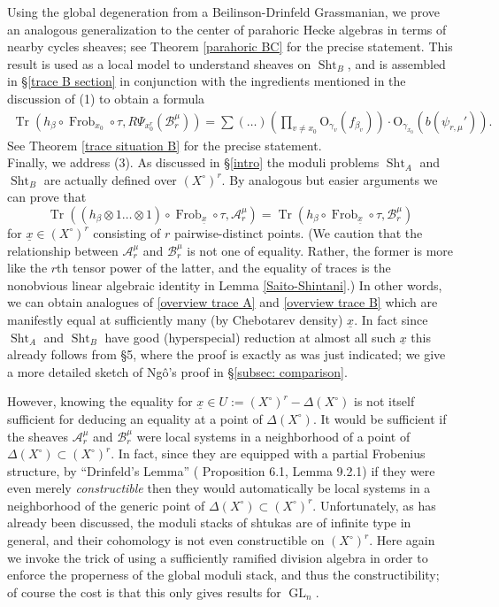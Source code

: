 \documentclass[reqno]{amsart}
\numberwithin{equation}{section}
\newcommand{\ul}[1]{\underline{#1}}
\newcommand{\Cal}[1]{\mathcal{#1}}
\newcommand{\mrm}[1]{\mathrm{#1}}
\DeclareMathOperator{\GL}{GL}
\DeclareMathOperator{\Frob}{Frob}
\DeclareMathOperator{\Tr}{Tr}
\DeclareMathOperator{\Sht}{Sht}
\theoremstyle{remark}
\numberwithin{equation}{section}
\begin{document}
Using the global degeneration from a Beilinson-Drinfeld Grassmanian, we prove an analogous generalization to the center of parahoric Hecke algebras in terms of nearby cycles sheaves; see Theorem \ref{parahoric BC} for the precise statement. This result is used as a local model to understand sheaves on $\Sht_B$, and is assembled in \S \ref{trace B section} in conjunction with the ingredients mentioned in the discussion of (1) to obtain a formula
\begin{align}\label{overview trace B}
\Tr( h_{\beta} \circ \Frob_{x_0} \circ  \tau , R\Psi_{x_0^r}(\Cal{B}_r^{\mu})) =   \sum (\ldots)\left(  \prod_{v \neq x_0} \mrm{O}_{\gamma_v}(f_{\beta_v}) \right) \cdot  \mrm{O}_{\gamma_{x_0}}(b(\psi_{r,\mu}')).
\end{align}
See Theorem \ref{trace situation B} for the precise statement. \\

Finally, we address (3). As discussed in \S \ref{intro} the moduli problems $\Sht_A$ and $\Sht_B$ are actually defined over $(X^{\circ})^r$. By analogous but easier arguments we can prove that 
\[
\Tr(( h_{\beta} \otimes 1 \ldots \otimes 1 ) \circ \Frob_{\ul{x}} \circ  \tau , \Cal{A}_r^{\mu})   = \Tr( h_{\beta} \circ \Frob_{\ul{x}} \circ  \tau , \Cal{B}_r^{\mu})
\]
for $\ul{x} \in (X^{\circ})^r$ consisting of $r$ pairwise-distinct points. (We caution that the relationship between $\Cal{A}_r^{\mu}$ and $\Cal{B}_r^{\mu}$ is not one of equality. Rather, the former is more like the $r$th tensor power of the latter, and the equality of traces is the nonobvious linear algebraic identity in Lemma \ref{Saito-Shintani}.) In other words, we can obtain analogues of \eqref{overview trace A} and \eqref{overview trace B} which are manifestly equal at sufficiently many (by Chebotarev density) $\ul{x}$. In fact since $\Sht_A$ and $\Sht_B$ have good (hyperspecial) reduction at almost all such $\ul{x}$ this already follows from \cite{Ngo06} \S 5, where the proof is exactly as was just indicated; we give a more detailed sketch of Ng\^{o}'s proof in \S \ref{subsec: comparison}.

However, knowing the equality for $\ul{x} \in U := (X^{\circ})^r - \Delta(X^{\circ})$ is not itself sufficient for deducing an equality at a point of $\Delta(X^{\circ})$. It would be sufficient if the sheaves $\Cal{A}_r^{\mu}$ and $ \Cal{B}_r^{\mu}$ were local systems in a neighborhood of a point of $\Delta(X^{\circ}) \subset  (X^{\circ})^r$. In fact, since they are equipped with a partial Frobenius structure, by ``Drinfeld's Lemma'' (\cite{Drin87} Proposition 6.1, \cite{Lau04} Lemma 9.2.1) if they were even merely \emph{constructible} then they would automatically be local systems in a neighborhood of the generic point of $\Delta(X^{\circ}) \subset  (X^{\circ})^r$. Unfortunately, as has already been discussed, the moduli stacks of shtukas are of infinite type in general, and their cohomology is not even constructible on $(X^{\circ})^r$. Here again we invoke the trick of using a sufficiently ramified division algebra in order to enforce the properness of the global moduli stack, and thus the constructibility; of course the cost is that this only gives results for $\GL_n$. 
\end{document}
